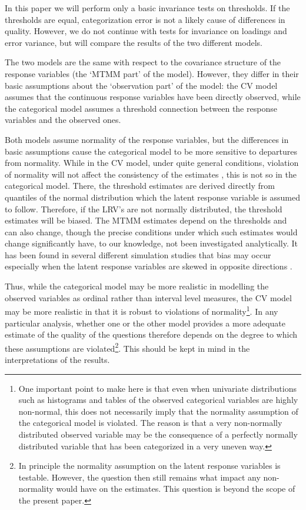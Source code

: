 \documentclass[a4paper,12pt]{article}
\begin{document}
In this paper we will perform only a basic invariance tests on thresholds. If the thresholds are equal, categorization error is not a likely cause of differences in quality. However, we do not continue with tests for invariance on loadings and error variance, but will compare the results of the two different models.


The two models are the same with respect to the covariance structure of the response variables (the `MTMM part' of the model). However, they differ in their basic assumptions about the `observation part' of the model: the CV model assumes that the continuous response variables have been directly observed, while the categorical model assumes a threshold connection between the response variables and the observed ones. 

Both models assume normality of the response variables, but the differences in basic assumptions cause the categorical model to be more sensitive to departures from normality. While in the CV model, under quite general conditions, violation of normality will not affect the consistency of the estimates \citep{satorra_robustness_1990}, this is not so in the categorical model. There, the threshold estimates are derived directly from quantiles of the normal distribution which the latent response variable is assumed to follow. Therefore, if the LRV's are not normally distributed, the threshold estimates will be biased. The MTMM estimates depend on the thresholds and can also change, though the precise conditions under which such estimates would change significantly have, to our knowledge, not been investigated analytically. It has been found in several different simulation studies that bias may occur especially when the latent response variables are skewed in opposite directions \citep{coenders_structural_1996}. 

Thus, while the categorical model may be more realistic in modelling the observed variables as ordinal rather than interval level measures, the CV model may be more realistic in that it is robust to violations of normality\footnote{One important point to make here is that even when univariate distributions such as histograms and tables of the observed categorical variables are highly non-normal, this does not necessarily imply that the normality assumption of the categorical model is violated. The reason is that a very non-normally distributed observed variable may be the consequence of a perfectly normally distributed variable that has been categorized in a very uneven way. }.
In any particular analysis, whether one or the other model provides a more adequate estimate of the quality of the questions therefore depends on the degree to which these assumptions are violated\footnote{In principle the normality assumption on the latent response variables is testable. However, the question then still remains what impact any non-normality would have on the estimates. This question is beyond the scope of the present paper.}. This should be kept in mind in the interpretations of the results.
\end{document}
